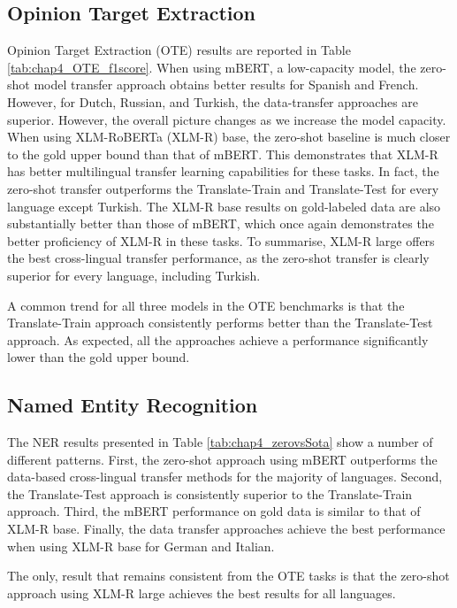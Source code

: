 \subsection{Opinion Target Extraction}
Opinion Target Extraction (OTE) results are reported in Table \ref{tab:chap4_OTE_f1score}. When using mBERT, a low-capacity model, the zero-shot model transfer approach obtains better results for Spanish and French. However, for Dutch, Russian, and Turkish, the data-transfer approaches are superior. However, the overall picture changes as we increase the model capacity. When using XLM-RoBERTa (XLM-R) base, the zero-shot baseline is much closer to the gold upper bound than that of mBERT. This demonstrates that XLM-R has better multilingual transfer learning capabilities for these tasks. In fact, the zero-shot transfer outperforms the Translate-Train and Translate-Test for every language except Turkish. The XLM-R base results on gold-labeled data are also substantially better than those of mBERT, which once again demonstrates the better proficiency of XLM-R in these tasks. To summarise, XLM-R large offers the best cross-lingual transfer performance, as the zero-shot transfer is clearly superior for every language, including Turkish.

A common trend for all three models in the OTE benchmarks is that the Translate-Train approach consistently performs better than the Translate-Test approach. As expected, all the approaches achieve a performance significantly lower than the gold upper bound.





\subsection{Named Entity Recognition}

The NER results presented in Table \ref{tab:chap4_zerovsSota} show a number of different patterns. First, the zero-shot approach using mBERT outperforms the data-based cross-lingual transfer methods for the majority of languages. Second, the Translate-Test approach is consistently superior to the Translate-Train approach. Third, the mBERT performance on gold data is similar to that of XLM-R base. Finally, the data transfer approaches achieve the best performance when using XLM-R base for German and Italian.

The only, result that remains consistent from the OTE tasks is that the zero-shot approach using XLM-R large achieves the best results for all languages.

